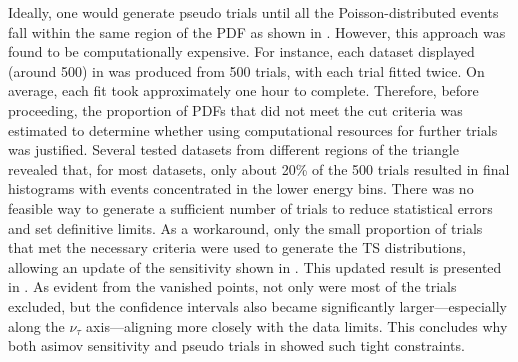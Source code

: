 Ideally, one would generate pseudo trials until all the Poisson-distributed events fall within the same region of the PDF as shown in . However, this approach was found to be computationally expensive. For instance, each dataset displayed (around 500) in  was produced from 500 trials, with each trial fitted twice. On average, each fit took approximately one hour to complete. Therefore, before proceeding, the proportion of PDFs that did not meet the cut criteria was estimated to determine whether using computational resources for further trials was justified. Several tested datasets from different regions of the triangle revealed that, for most datasets, only about 20\% of the 500 trials resulted in final histograms with events concentrated in the lower energy bins. There was no feasible way to generate a sufficient number of trials to reduce statistical errors and set definitive limits. As a workaround, only the small proportion of trials that met the necessary criteria were used to generate the TS distributions, allowing an update of the sensitivity shown in . This updated result is presented in . As evident from the vanished points, not only were most of the trials excluded, but the confidence intervals also became significantly larger—especially along the $\nu_{\tau}$ axis—aligning more closely with the data limits. This concludes why both asimov sensitivity and pseudo trials in  showed such tight constraints. 

